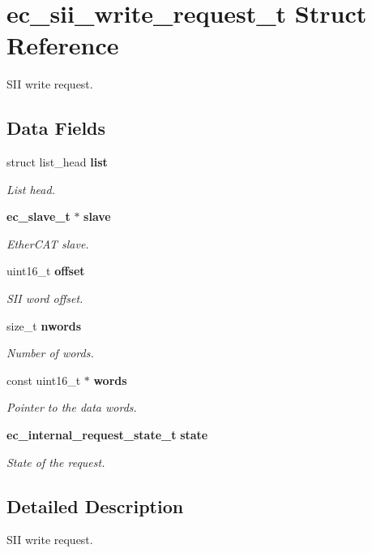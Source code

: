 \section{ec\-\_\-sii\-\_\-write\-\_\-request\-\_\-t Struct Reference}
\label{structec__sii__write__request__t}


S\-I\-I write request.  


\subsection*{Data Fields}
\begin{DoxyCompactItemize}
\item 
struct list\-\_\-head {\bf list}
\begin{DoxyCompactList}\small\item\em List head. \end{DoxyCompactList}\item 
{\bf ec\-\_\-slave\-\_\-t} $\ast$ {\bf slave}
\begin{DoxyCompactList}\small\item\em Ether\-C\-A\-T slave. \end{DoxyCompactList}\item 
uint16\-\_\-t {\bf offset}
\begin{DoxyCompactList}\small\item\em S\-I\-I word offset. \end{DoxyCompactList}\item 
size\-\_\-t {\bf nwords}
\begin{DoxyCompactList}\small\item\em Number of words. \end{DoxyCompactList}\item 
const uint16\-\_\-t $\ast$ {\bf words}
\begin{DoxyCompactList}\small\item\em Pointer to the data words. \end{DoxyCompactList}\item 
{\bf ec\-\_\-internal\-\_\-request\-\_\-state\-\_\-t} {\bf state}
\begin{DoxyCompactList}\small\item\em State of the request. \end{DoxyCompactList}\end{DoxyCompactItemize}


\subsection{Detailed Description}
S\-I\-I write request. 

